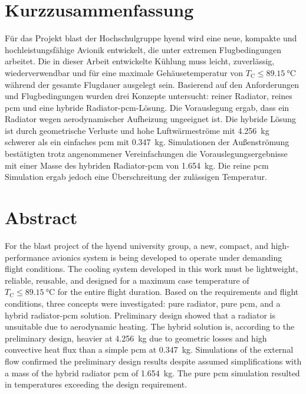 \chapter*{Kurzzusammenfassung} %
\label{chap:Kurzzusammenfassung}


Für das Projekt \ac{blast} der Hochschulgruppe \ac{hyend} wird eine neue, kompakte und hochleistungsfähige Avionik entwickelt,
die unter extremen Flugbedingungen arbeitet. Die in dieser Arbeit entwickelte Kühlung muss leicht, zuverlässig, wiederverwendbar und für eine
maximale Gehäusetemperatur von $T_\mathrm{C} \leq \SI{89.15}{\celsius}$ während der gesamte Flugdauer ausgelegt sein.
Basierend auf den Anforderungen und Flugbedingungen
wurden drei Konzepte untersucht: reiner Radiator, reines \ac{pcm} und eine hybride Radiator-\ac{pcm}-Lösung. Die Vorauslegung
ergab, dass ein Radiator wegen aerodynamischer Aufheizung ungeeignet ist. Die hybride Lösung ist durch geometrische
Verluste und hohe Luftwärmeströme mit \SI{4,256}{\kilogram} schwerer als ein einfaches \ac{pcm}
mit \SI{0,347}{\kilogram}. Simulationen der Außenströmung
bestätigten trotz angenommener Vereinfachungen die Vorauslegungsergebnisse mit einer Masse des hybriden Radiator-\ac{pcm} von \SI{1,654}{\kilogram}.
Die reine \ac{pcm} Simulation ergab jedoch eine Überschreitung der zulässigen Temperatur.

\chapter*{Abstract} %
\label{chap:Abstract}
For the \ac{blast} project of the \ac{hyend} university group, a new, compact, and high-performance avionics system is being developed to
operate under demanding flight conditions. The cooling system developed in this work must be lightweight, reliable, reusable, and designed for a maximum
case temperature of $T_\mathrm{C} \leq \SI{89.15}{\celsius}$ for the entire flight duration.
Based on the requirements and flight conditions, three concepts were investigated: pure radiator, pure \ac{pcm}, and a hybrid radiator-\ac{pcm}
solution. Preliminary design showed that a radiator is unsuitable due to aerodynamic heating. The hybrid solution is, according to
the preliminary design, heavier at \SI{4,256}{\kilogram} due to geometric losses and high convective heat flux than a simple \ac{pcm} at
\SI{0,347}{\kilogram}. Simulations of the external flow confirmed the preliminary design results despite assumed
simplifications with a mass of the hybrid radiator \ac{pcm} of \SI{1,654}{\kilogram}. The pure \ac{pcm} simulation resulted in temperatures
exceeding the design requirement.